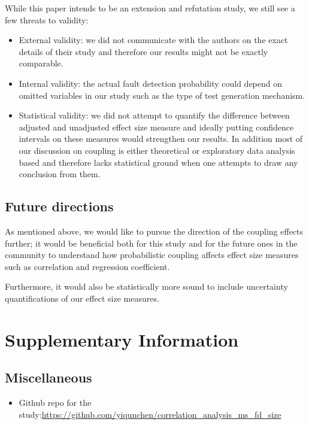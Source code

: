 \documentclass[10pt,letterpaper]{article}
\begin{document}
While this paper intends to be an extension and refutation study, we still see a few threats to validity: 
\begin{itemize}
\item
External validity: we did not communicate with the authors on the exact details of their study and therefore our results might not be exactly comparable.

\item

Internal validity: the actual fault detection probability could depend on omitted variables in our study such as the type of test generation mechanism.

\item

Statistical validity: we did not attempt to quantify the difference between adjusted and unadjusted effect size measure and ideally putting confidence intervals on these measures would strengthen our results. In addition most of our discussion on coupling is either theoretical or exploratory data analysis based and therefore lacks statistical ground when one attempts to draw any conclusion from them. 
\end{itemize}

\subsection{Future directions}

As mentioned above, we would like to pursue the direction of the coupling effects further; it would be beneficial both for this study and for the future ones in the community to understand how probabilistic coupling affects effect size measures such as correlation and regression coefficient.

Furthermore, it would also be statistically more sound to include uncertainty quantifications of our effect size measures.


\section*{Supplementary Information}


\subsection*{Miscellaneous}

\begin{itemize}
\item 
Github repo for the study:\url{https://github.com/yiqunchen/correlation_analysis_ms_fd_size}
\end{itemize}
\end{document}
